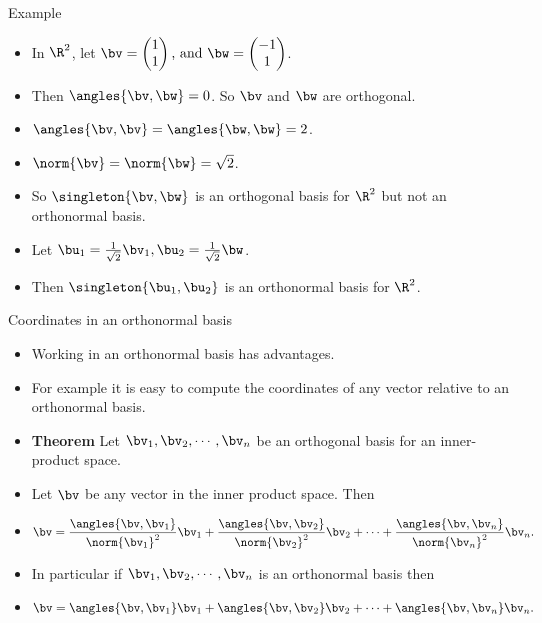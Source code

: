 \documentclass{beamer}
\begin{document}
\begin{frame}{Example}

\begin{itemize}
\item In $\R^2$, let $\bv=
\begin{pmatrix}
1 \\ 1
\end{pmatrix}
\text{, and }
\bw=
\begin{pmatrix}
-1 \\ 1
\end{pmatrix}
$.
\item Then $\angles{\bv,\bw}=0$. So $\bv$ and $\bw$ are orthogonal.
\item $\angles{\bv,\bv}=\angles{\bw,\bw}=2$.
\item $\norm{\bv}=\norm{\bw}=\sqrt{2}$.
\item So $\singleton{\bv,\bw}$ is an orthogonal basis for $\R^2$ but not an orthonormal basis.
\item Let $\bu_1 = \frac{1}{\sqrt{2}}\bv_1, \bu_2=\frac{1}{\sqrt{2}}\bw$.
\item Then $\singleton{\bu_1,\bu_2}$ is an orthonormal basis for $\R^2$.
\end{itemize}
\end{frame}

\begin{frame}{Coordinates in an orthonormal basis}
\begin{itemize}
\item Working in an orthonormal basis has advantages.
\item For example it is easy to compute the coordinates of any vector relative to an orthonormal basis.
\item \textbf{Theorem} Let $\bv_1,\bv_2,\cdots,\bv_n$ be an orthogonal basis for an inner-product space.
\item Let $\bv$ be any vector in the inner product space. Then
\item $$\bv=\frac{\angles{\bv,\bv_1}}{\norm{\bv_1}^2}\bv_1 + \frac{\angles{\bv,\bv_2}}{\norm{\bv_2}^2}\bv_2+\cdots+\frac{\angles{\bv,\bv_n}}{\norm{\bv_n}^2}\bv_n.$$
\item In particular if $\bv_1,\bv_2,\cdots,\bv_n$ is an orthonormal basis then
\item $$\bv=\angles{\bv,\bv_1}\bv_1+\angles{\bv,\bv_2}\bv_2+\cdots+\angles{\bv,\bv_n}\bv_n.$$
\end{itemize}
\end{frame}
\end{document}
